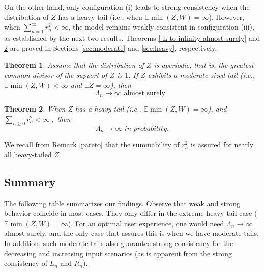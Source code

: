 \documentclass[12pt]{article}
\newcommand{\E}{\mathbb{E}}
\newtheorem{theorem}{Theorem}
\numberwithin{equation}{section} \font\titre=cmbx12
\newcommand{\leftmost}{L}
\newcommand{\rightmost}{R}
\newcommand{\leaves}{\Lambda}
\begin{document}
On the other hand, only configuration (i) leads to strong consistency
when the distribution of $Z$ has a heavy-tail (i.e., when $\E
\min(Z,W) = \infty$). However, when $\sum_{n=1}^\infty r_n^2 <
\infty$, the model remains weakly consistent in configuration (iii),
as established by the next two results. Theorems \ref{ L to infinity
  almost surely} and \ref{weak thm Emin=infty} are proved in  Sections
\ref{sec:moderate} and \ref{sec:heavy}, respectively.

\color{black}
\begin{theorem}\label{ L to infinity almost surely}
    Assume that the distribution of $Z$ is aperiodic, that is, the greatest common divisor of the support of $Z$ is $1$. If $Z$ exhibits a moderate-sized tail (i.e., $\E \min (Z,W)<\infty$ and $\E Z = \infty$), then 
    $$\leaves_n\to \infty \text{ almost surely. }$$
    \end{theorem}
\color{black}


\begin{theorem}\label{weak thm Emin=infty}
    When $Z$ has a heavy tail (i.e., $\E \min(Z,W) = \infty$), and $\sum_{n\ge0}r_n^2 < \infty~,$ then $$\leaves_n\to \infty \textit{ in probability.}$$
\end{theorem}

We recall from Remark \ref{pareto} that the summability of $r_n^2$ is assured for nearly all
heavy-tailed $Z$.



\subsection{Summary}\label{sec:summary}

The following table summarizes our findings. 
Observe that weak and strong behavior coincide in most cases.
They only differ in the extreme heavy tail case ($\E \min(Z,W) = \infty$). For an optimal user experience, one would need $\leaves_n \to \infty$ almost surely, and the only case that assures this is when we have moderate tails. In addition, such moderate tails also guarantee strong consistency for the decreasing and increasing input scenarios (as is apparent from the strong consistency of $\leftmost_n$ and $\rightmost_n$).
\vspace{.5cm}
\end{document}
